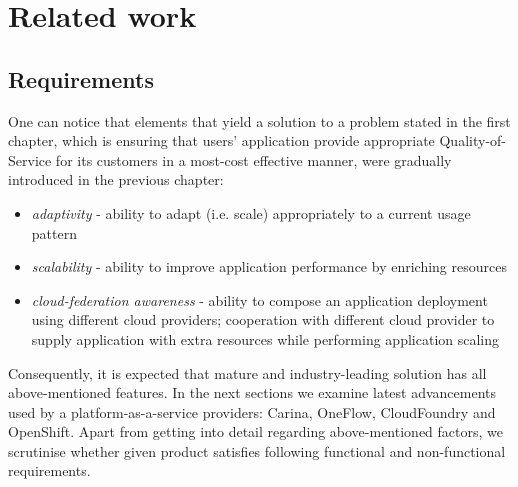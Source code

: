 \chapter{Related work} 


\section{Requirements}
One can notice that elements that yield a solution to a problem stated in the first chapter, which is ensuring that users' application provide appropriate Quality-of-Service for its customers in a most-cost effective manner, were gradually introduced in the previous chapter:

\begin{itemize}
	\item \emph{adaptivity} - ability to adapt (i.e. scale) appropriately to a current usage pattern
	\item \emph{scalability} - ability to improve application performance by enriching resources
	\item \emph{cloud-federation awareness} - ability to compose an application deployment using different cloud providers; cooperation with different cloud provider to supply application with extra resources while performing application scaling
\end{itemize}

Consequently, it is expected that mature and industry-leading solution has all above-mentioned features. In the next sections we examine latest advancements used by a platform-as-a-service providers: Carina, OneFlow, CloudFoundry and OpenShift. Apart from getting into detail regarding above-mentioned factors, we scrutinise whether given product satisfies following functional and non-functional requirements. 

